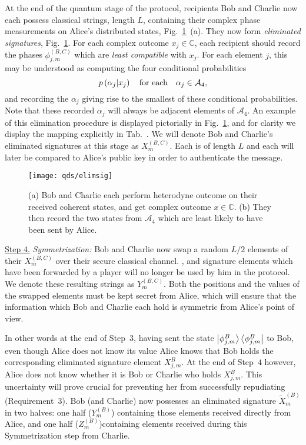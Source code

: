 At the end of the quantum stage of the protocol, recipients Bob and Charlie now each possess classical strings, length $L$, containing their complex phase measurements on Alice's distributed states, Fig.~\ref{fig:elimsig}~(a). They now form \emph{eliminated signatures}, Fig.~\ref{fig:elimsig}. For each complex outcome $x_j\in\mathbb{C}$, each recipient should record the phases $\phi_{j, m}^{\left(B, C\right)}$ which are \emph{least compatible} with $x_j$. For each element $j$, this may be understood as computing the four conditional probabilities 
\begin{equation}
p\left(\alpha_j | x_j\right) \qq{for each} \alpha_j \in \mathcal{A}_4,
\end{equation}
and recording the $\alpha_j$ giving rise to the smallest of these conditional probabilities. Note that these recorded $\alpha_j$ will always be adjacent elements of $\mathcal{A}_4$. An example of this elimination procedure is displayed pictorially in Fig.~\ref{fig:elimsig}, and for clarity we display the mapping explicitly in Tab.~.  We will denote Bob and Charlie's eliminated signatures at this stage as $X_m^{\left(B, C\right)}$. Each is of length $L$ and each will later be compared to Alice's public key in order to authenticate the message. 

\begin{figure}[htp]
\centering
\texttt{[image: qds/elimsig]}
\caption{\label{fig:elimsig}  (a) Bob and Charlie each perform heterodyne outcome on their received coherent states, and get complex outcome $x \in \mathbb{C}$. (b) They then record the two states from $\mathcal{A}_4$ which are least likely to have been sent by Alice.}
\end{figure}

\par
\noindent \underline{Step 4.} \emph{Symmetrization:} Bob and Charlie now swap a random $L/2$ elements of their $X_m^{\left(B, C\right)}$ over their secure classical channel. , and signature elements which have been forwarded by a player will no longer be used by him in the protocol. We denote these resulting strings as $Y_m^{\left(B, C\right)}$. Both the positions and the values of the swapped elements must be kept secret from Alice, which will ensure that the information which Bob and Charlie each hold is symmetric from Alice's point of view. 

In other words at the end of Step~$3$, having sent the state $\ket{\phi_{j, m}^B}\bra{\phi_{j, m}^B}$ to Bob, even though Alice does not know its value Alice knows that Bob holds the corresponding eliminated signature element $X_{j, m}^B$. At the end of Step~$4$ however, Alice does not know whether it is Bob or Charlie who holds $X_{j, m}^B$. This uncertainty will prove crucial for preventing her from successfully repudiating (Requirement~$3$). Bob (and Charlie) now possesses an eliminated signature $\tilde{X}_m^{\left(B\right)}$ in two halves: one half ($Y_m^{\left(B\right)}$) containing those elements received directly from Alice, and one half ($Z_m^{\left(B\right)}$)containing elements received during this Symmetrization step from Charlie.

